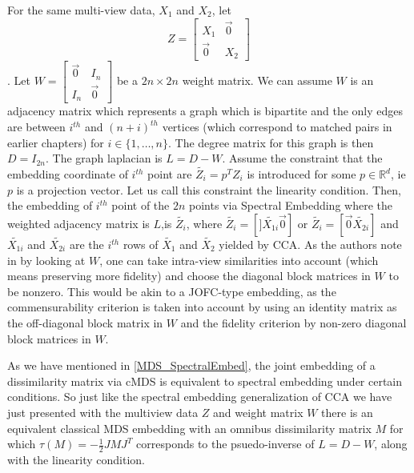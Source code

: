 \documentclass[12pt,oneside,final]{thesis}\usepackage[]{graphicx}\usepackage[]{color}
\begin{document}
For the same multi-view data, $X_1$ and $X_2$,
let \[ Z= \left[
\begin{array}{cc}
                  X_1 & \vec{0} \\
                \vec{0}   & X_2 
                \end{array}
                \right]
                \].
                Let $W=\left[
                \begin{array}{cc}
                \vec{0} & I_n \\
                I_n   & \vec{0}
                \end{array}
                \right]$ be a $2n \times 2n$ weight matrix. We can assume $W$ is an adjacency matrix which represents a graph which is bipartite and the only  edges are between $i^{th}$ and $(n+i)^{th}$ vertices (which correspond to matched pairs in earlier chapters) for $i \in \{1,\ldots,n\}$. The degree matrix for this graph is then  $D=I_{2n}$. The graph laplacian is $L=D-W$. Assume the constraint that the embedding coordinate of $i^{th}$ point are $\widetilde{Z_i}=p^{T}Z_i$ is introduced for some $p \in \mathbb{R}^d$, ie $p$ is a projection vector. Let us call this constraint the linearity condition. Then, the embedding of $i^{th}$ point of the $2n$ points  via Spectral Embedding where the weighted adjacency matrix is $L$,is $\widetilde{Z_i}$, where $\widetilde{Z_i}= \left[] \tilde{X_{1i}} \vec{0} \right]$ or  $\tilde{Z_i}=\left[ \vec{0} \tilde{X_{2i}} \right]$ and $\tilde{X_{1i}}$ and $\tilde{X_{2i}}$ are  the $i^{th}$ rows of $\tilde{X_1}$ and $\tilde{X_2}$ yielded by CCA.  As the authors note in \cite{CCAviaSpectralEmbed} by looking at $W$, one can take intra-view similarities into account (which means preserving more fidelity) and choose the diagonal block matrices in $W$ to be nonzero.
                This would be akin to a JOFC-type embedding, as the commensurability criterion is taken into account by using  an identity matrix as the  off-diagonal block matrix in $W$ and the fidelity criterion by non-zero diagonal block matrices in $W$.
                
             As we have mentioned in \ref{MDS_SpectralEmbed}, the joint embedding of a dissimilarity matrix  via cMDS  is equivalent to spectral embedding under certain conditions.
So just like the spectral embedding generalization of CCA  we have just presented with the multiview data $Z$ and weight matrix $W$ there is an equivalent classical MDS embedding with an omnibus dissimilarity matrix $M$ for which $\tau(M)=-\frac{1}{2}JMJ^T$  corresponds  to the  psuedo-inverse of  $L=D-W$, along with the linearity condition.
\end{document}

